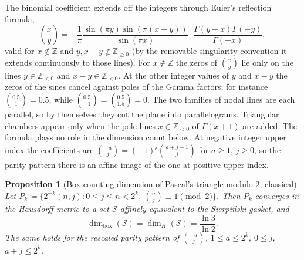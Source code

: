 \documentclass[11pt,a4paper]{article}
\theoremstyle{plain}
\newtheorem{proposition}[theorem]{Proposition}
\theoremstyle{definition}
\theoremstyle{remark}
\numberwithin{equation}{section}
\begin{document}
The binomial coefficient extends off the integers through Euler's reflection formula,
\begin{equation}
\label{eq:reflection}
\binom{x}{y} = -\frac{1}{\pi}\frac{\sin(\pi y)\sin(\pi(x-y))}{\sin(\pi x)} \cdot \frac{\Gamma(y-x)\Gamma(-y)}{\Gamma(-x)},
\end{equation}
valid for $x \notin \mathbb{Z}$ and $y, x-y \notin \mathbb{Z}_{\ge 0}$ (by the removable-singularity convention it extends continuously to those lines). For $x \notin \mathbb{Z}$ the zeros of $\binom{x}{y}$ lie only on the lines $y \in \mathbb{Z}_{<0}$ and $x - y \in \mathbb{Z}_{<0}$. At the other integer values of $y$ and $x - y$ the zeros of the sines cancel against poles of the Gamma factors; for instance $\binom{0.5}{1} = 0.5$, while $\binom{0.5}{-1} = \binom{0.5}{1.5} = 0$. The two families of nodal lines are each parallel, so by themselves they cut the plane into parallelograms. Triangular chambers appear only when the pole lines $x \in \mathbb{Z}_{<0}$ of $\Gamma(x+1)$ are added. The formula plays no role in the dimension count below. At negative integer upper index the coefficients are $\binom{-a}{j} = (-1)^j\binom{a+j-1}{j}$ for $a \ge 1$, $j \ge 0$, so the parity pattern there is an affine image of the one at positive upper index.

\begin{proposition}[Box-counting dimension of Pascal's triangle modulo $2$; classical]
\label{prop:pascal_mod2}
Let $P_k \coloneqq \{2^{-k}(n, j) : 0 \le j \le n < 2^k,\ \binom{n}{j} \equiv 1 \pmod 2\}$. Then $P_k$ converges in the Hausdorff metric to a set $\mathcal{S}$ affinely equivalent to the Sierpi\'nski gasket, and
\begin{equation}
\dim_{\text{box}}(\mathcal{S}) = \dim_H(\mathcal{S}) = \frac{\ln 3}{\ln 2}.
\end{equation}
The same holds for the rescaled parity pattern of $\binom{-a}{j}$, $1 \le a \le 2^k$, $0 \le j$, $a + j \le 2^k$.
\end{proposition}
\end{document}
